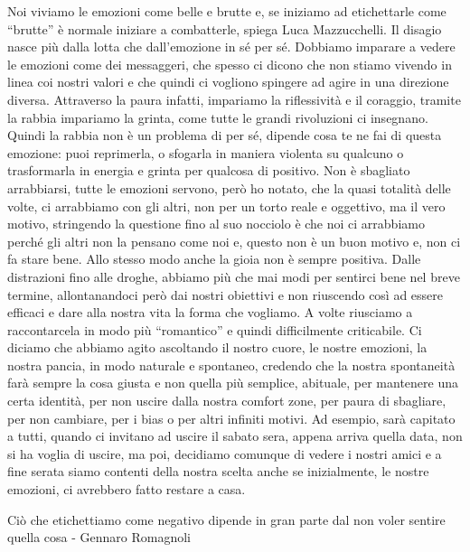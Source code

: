 \documentclass[12pt]{book} %
\begin{document}
Noi viviamo le emozioni come belle e brutte e, se iniziamo ad etichettarle come “brutte” è normale iniziare a
combatterle, spiega Luca Mazzucchelli. Il disagio nasce più dalla lotta che dall'emozione in sé
per sé. Dobbiamo imparare a vedere le emozioni come dei messaggeri, che spesso ci dicono che non stiamo vivendo in
linea coi nostri valori e che quindi ci vogliono spingere ad agire in una direzione diversa. Attraverso la paura
infatti, impariamo la riflessività e il coraggio, tramite la rabbia impariamo la grinta, come tutte le grandi
rivoluzioni ci insegnano. Quindi la rabbia non è un problema di per sé, dipende cosa te ne fai di questa emozione: puoi
reprimerla, o sfogarla in maniera violenta su qualcuno o trasformarla in energia e grinta per qualcosa di positivo.
Non è sbagliato arrabbiarsi, tutte le emozioni servono, però ho notato, che la quasi totalità delle volte, ci arrabbiamo con gli altri, non per un torto reale e oggettivo, ma il vero motivo, stringendo la questione fino al suo nocciolo è che noi ci arrabbiamo perché gli altri non la pensano come noi e, questo non è un buon motivo e, non ci fa stare bene.
Allo stesso modo anche la gioia non è sempre positiva. Dalle distrazioni fino alle droghe, abbiamo più che mai modi per
sentirci bene nel breve termine, allontanandoci però dai nostri obiettivi e non riuscendo così ad essere efficaci e
dare alla nostra vita la forma che vogliamo. A volte riusciamo a raccontarcela in modo più “romantico” e quindi
difficilmente criticabile. Ci diciamo che abbiamo agito ascoltando il nostro cuore, le nostre emozioni, la nostra
pancia, in modo naturale e spontaneo, credendo che la nostra spontaneità farà sempre la cosa giusta e non quella più
semplice, abituale, per mantenere una certa identità, per non uscire dalla nostra comfort zone, per paura di sbagliare,
per non cambiare, per i bias o per altri infiniti motivi. Ad esempio, sarà capitato a tutti, quando ci invitano ad
uscire il sabato sera, appena arriva quella data, non si ha voglia di uscire, ma poi, decidiamo comunque di vedere i
nostri amici e a fine serata siamo contenti della nostra scelta anche se inizialmente, le nostre emozioni, ci avrebbero
fatto restare a casa.

Ciò che etichettiamo come negativo dipende in gran parte dal non voler sentire quella cosa - Gennaro Romagnoli
\end{document}
